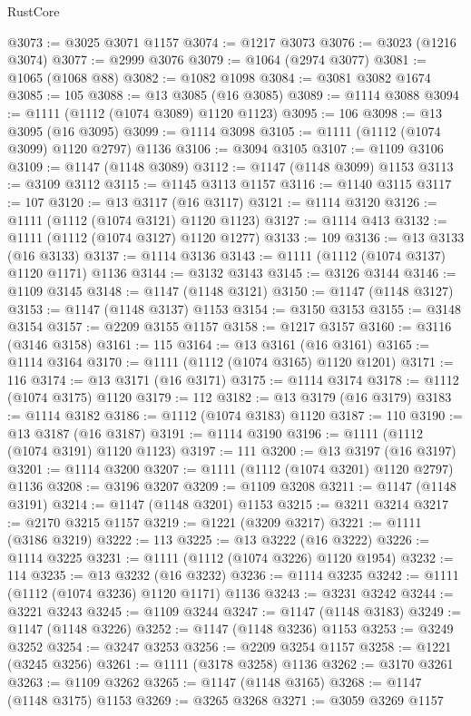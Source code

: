 \begin{lexlean}{RustCore}
\begin{coremodule}
@3073 := @3025 @3071 @1157
@3074 := @1217 @3073
@3076 := @3023 (@1216 @3074)
@3077 := @2999 @3076
@3079 := @1064 (@2974 @3077)
@3081 := @1065 (@1068 @88)
@3082 := @1082 @1098
@3084 := @3081 @3082 @1674
@3085 := 105
@3088 := @13 @3085 (@16 @3085)
@3089 := @1114 @3088
@3094 := @1111 (@1112 (@1074 @3089) @1120 @1123)
@3095 := 106
@3098 := @13 @3095 (@16 @3095)
@3099 := @1114 @3098
@3105 := @1111 (@1112 (@1074 @3099) @1120 @2797) @1136
@3106 := @3094 @3105
@3107 := @1109 @3106
@3109 := @1147 (@1148 @3089)
@3112 := @1147 (@1148 @3099) @1153
@3113 := @3109 @3112
@3115 := @1145 @3113 @1157
@3116 := @1140 @3115
@3117 := 107
@3120 := @13 @3117 (@16 @3117)
@3121 := @1114 @3120
@3126 := @1111 (@1112 (@1074 @3121) @1120 @1123)
@3127 := @1114 @413
@3132 := @1111 (@1112 (@1074 @3127) @1120 @1277)
@3133 := 109
@3136 := @13 @3133 (@16 @3133)
@3137 := @1114 @3136
@3143 := @1111 (@1112 (@1074 @3137) @1120 @1171) @1136
@3144 := @3132 @3143
@3145 := @3126 @3144
@3146 := @1109 @3145
@3148 := @1147 (@1148 @3121)
@3150 := @1147 (@1148 @3127)
@3153 := @1147 (@1148 @3137) @1153
@3154 := @3150 @3153
@3155 := @3148 @3154
@3157 := @2209 @3155 @1157
@3158 := @1217 @3157
@3160 := @3116 (@3146 @3158)
@3161 := 115
@3164 := @13 @3161 (@16 @3161)
@3165 := @1114 @3164
@3170 := @1111 (@1112 (@1074 @3165) @1120 @1201)
@3171 := 116
@3174 := @13 @3171 (@16 @3171)
@3175 := @1114 @3174
@3178 := @1112 (@1074 @3175) @1120
@3179 := 112
@3182 := @13 @3179 (@16 @3179)
@3183 := @1114 @3182
@3186 := @1112 (@1074 @3183) @1120
@3187 := 110
@3190 := @13 @3187 (@16 @3187)
@3191 := @1114 @3190
@3196 := @1111 (@1112 (@1074 @3191) @1120 @1123)
@3197 := 111
@3200 := @13 @3197 (@16 @3197)
@3201 := @1114 @3200
@3207 := @1111 (@1112 (@1074 @3201) @1120 @2797) @1136
@3208 := @3196 @3207
@3209 := @1109 @3208
@3211 := @1147 (@1148 @3191)
@3214 := @1147 (@1148 @3201) @1153
@3215 := @3211 @3214
@3217 := @2170 @3215 @1157
@3219 := @1221 (@3209 @3217)
@3221 := @1111 (@3186 @3219)
@3222 := 113
@3225 := @13 @3222 (@16 @3222)
@3226 := @1114 @3225
@3231 := @1111 (@1112 (@1074 @3226) @1120 @1954)
@3232 := 114
@3235 := @13 @3232 (@16 @3232)
@3236 := @1114 @3235
@3242 := @1111 (@1112 (@1074 @3236) @1120 @1171) @1136
@3243 := @3231 @3242
@3244 := @3221 @3243
@3245 := @1109 @3244
@3247 := @1147 (@1148 @3183)
@3249 := @1147 (@1148 @3226)
@3252 := @1147 (@1148 @3236) @1153
@3253 := @3249 @3252
@3254 := @3247 @3253
@3256 := @2209 @3254 @1157
@3258 := @1221 (@3245 @3256)
@3261 := @1111 (@3178 @3258) @1136
@3262 := @3170 @3261
@3263 := @1109 @3262
@3265 := @1147 (@1148 @3165)
@3268 := @1147 (@1148 @3175) @1153
@3269 := @3265 @3268
@3271 := @3059 @3269 @1157

\end{coremodule}
\end{lexlean}
